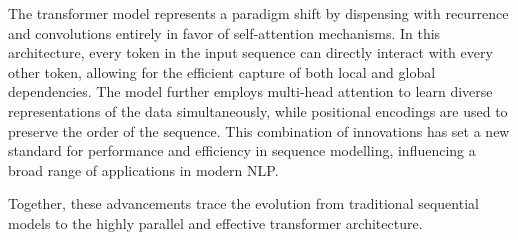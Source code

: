 The transformer model represents a paradigm shift by dispensing with recurrence and convolutions entirely in favor of self-attention mechanisms. In this architecture, every token in the input sequence can directly interact with every other token, allowing for the efficient capture of both local and global dependencies. The model further employs multi-head attention to learn diverse representations of the data simultaneously, while positional encodings are used to preserve the order of the sequence. This combination of innovations has set a new standard for performance and efficiency in sequence modelling, influencing a broad range of applications in modern NLP.

Together, these advancements trace the evolution from traditional sequential models to the highly parallel and effective transformer architecture.
